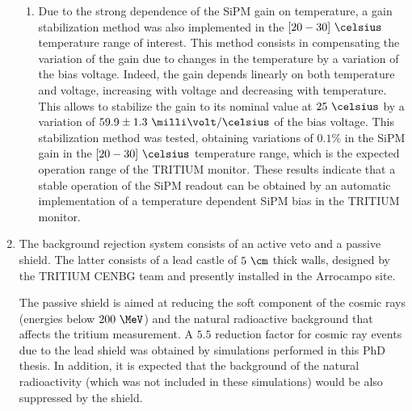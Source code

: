 \begin{enumerate}
\begin{enumerate}

\item{} Due to the strong dependence of the SiPM gain on temperature, a gain stabilization method was also implemented in the $[20-30]~\celsius$ temperature range of interest. This method consists in compensating the variation of the gain due to changes in the temperature by a variation of the bias voltage. Indeed, the gain depends linearly on both temperature and voltage, increasing with voltage and decreasing with temperature. This allows to stabilize the gain to its nominal value at $25~\celsius$ by a variation of $59.9 \pm 1.3 ~\milli\volt/\celsius$ of the bias voltage. This stabilization method was tested, obtaining variations of $0.1\%$ in the SiPM gain in the $[20-30]~\celsius$ temperature range, which is the expected operation range of the TRITIUM monitor. These results indicate that a stable operation of the SiPM readout can be obtained by an automatic implementation of a temperature dependent SiPM bias in the TRITIUM monitor.

\end{enumerate}

\item{} The background rejection system consists of an active veto and a passive shield. The latter consists of a lead castle of $5~\cm$ thick walls, designed by the TRITIUM CENBG team and presently installed in the Arrocampo site. 

The passive shield is aimed at reducing the soft component of the cosmic rays (energies below $200~\MeV$) and the natural radioactive background that affects the tritium measurement. A $5.5$ reduction factor for cosmic ray events due to the lead shield was obtained by simulations performed in this PhD thesis. In addition, it is expected that the background of the natural radioactivity (which was not included in these simulations) would be also suppressed by the shield. 


\end{enumerate}
